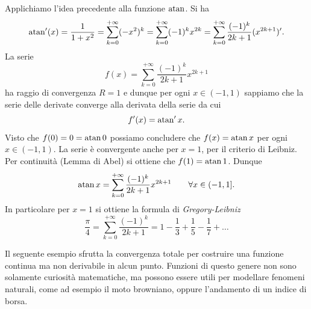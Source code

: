 \begin{example}
Applichiamo l'idea precedente alla funzione $\operatorname{atan}$. Si ha
\[
  \operatorname{atan}'(x) = \frac{1}{1+x^2} = \sum_{k=0}^{+\infty} (-x^2)^k
  = \sum_{k=0}^{+\infty} (-1)^k x^{2k}
  = \sum_{k=0}^{+\infty} \frac{(-1)^k}{2k+1}(x^{2k+1})'.
\]
La serie
\[
 f(x) = \sum_{k=0}^{+\infty}\frac{(-1)^k}{2k+1} x^{2k+1}
\]
ha raggio di convergenza $R=1$ e dunque per ogni $x\in(-1,1)$ sappiamo che la serie delle derivate converge alla derivata della serie da cui
\[
  f'(x) = \operatorname{atan}' x.
\]
Visto che $f(0) = 0 = \operatorname{atan} 0$ possiamo concludere che $f(x) =\operatorname{atan} x$ per ogni $x\in (-1,1)$.
La serie è convergente anche per $x=1$, per il criterio di Leibniz. Per continuità (Lemma di Abel) si ottiene che $f(1) = \operatorname{atan} 1$.
Dunque
\[
  \operatorname{atan} x = \sum_{k=0}^{+\infty}\frac{(-1)^k}{2k+1}x^{2k+1}
  \qquad \forall x \in (-1,1].
\]
In particolare per $x=1$ si ottiene la formula di \emph{Gregory-Leibniz}%
\[
  \frac{\pi}{4} = \sum_{k=0}^{+\infty} \frac{(-1)^k}{2k+1} =
   1 - \frac{1}{3} + \frac{1}{5} - \frac{1}{7} + \dots
\]
\end{example}

Il seguente esempio sfrutta la convergenza totale 
per costruire una funzione continua ma non derivabile in alcun punto.
Funzioni di questo genere non sono solamente curiosità matematiche, 
ma possono essere utili per modellare fenomeni naturali, 
come ad esempio il moto browniano, oppure l'andamento di un indice di borsa.

